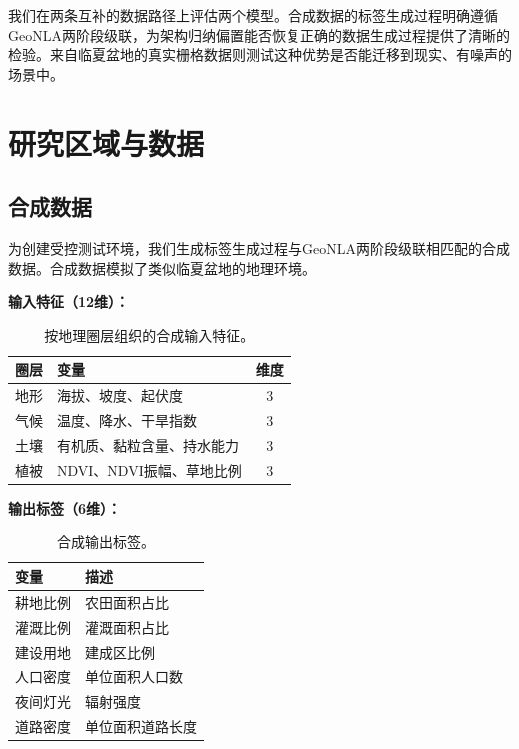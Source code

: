\documentclass[a4paper,11pt]{article}
\begin{document}
我们在两条互补的数据路径上评估两个模型。合成数据的标签生成过程明确遵循GeoNLA两阶段级联，为架构归纳偏置能否恢复正确的数据生成过程提供了清晰的检验。来自临夏盆地的真实栅格数据则测试这种优势是否能迁移到现实、有噪声的场景中。

\section{研究区域与数据}
\label{sec:study_area}

\subsection{合成数据}
\label{subsec:synthetic_data}

为创建受控测试环境，我们生成标签生成过程与GeoNLA两阶段级联相匹配的合成数据。合成数据模拟了类似临夏盆地的地理环境。

\textbf{输入特征（12维）：}

\begin{table}[htbp]
\centering
\caption{按地理圈层组织的合成输入特征。}
\label{tab:input_features}
\begin{tabular}{llc}
\toprule
圈层 & 变量 & 维度 \\
\midrule
地形 & 海拔、坡度、起伏度 & 3 \\
气候 & 温度、降水、干旱指数 & 3 \\
土壤 & 有机质、黏粒含量、持水能力 & 3 \\
植被 & NDVI、NDVI振幅、草地比例 & 3 \\
\bottomrule
\end{tabular}
\end{table}

\textbf{输出标签（6维）：}

\begin{table}[htbp]
\centering
\caption{合成输出标签。}
\label{tab:output_labels}
\begin{tabular}{ll}
\toprule
变量 & 描述 \\
\midrule
耕地比例 & 农田面积占比 \\
灌溉比例 & 灌溉面积占比 \\
建设用地 & 建成区比例 \\
人口密度 & 单位面积人口数 \\
夜间灯光 & 辐射强度 \\
道路密度 & 单位面积道路长度 \\
\bottomrule
\end{tabular}
\end{table}
\end{document}

